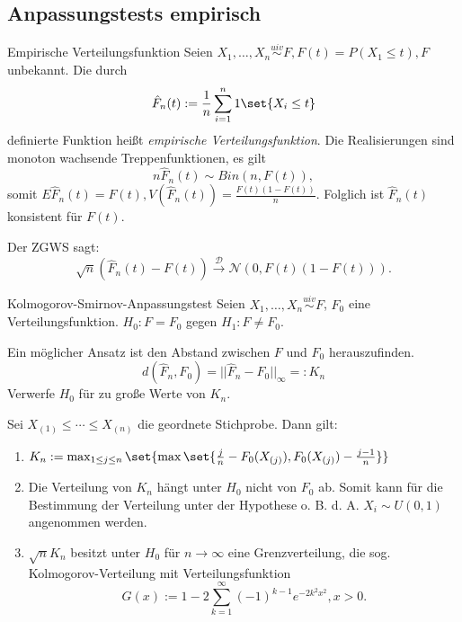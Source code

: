 \subsection{Anpassungstests empirisch}

\begin{karte}{Empirische Verteilungsfunktion}
Seien \(X_1, \ldots, X_n \overset{uiv}{\sim} F, F(t) = P(X_1 \leq t), F\) unbekannt. 
Die durch 
\[ \hat{F}_n(t) := \frac{1}{n}\sum_{i=1}^n 1\set{X_i \leq t} \]
definierte Funktion heißt \textit{empirische Verteilungsfunktion}.
Die Realisierungen sind monoton wachsende Treppenfunktionen, es gilt 
\[ n \hat{F}_n(t) \sim Bin(n, F(t)), \]
somit \(E \hat{F}_n(t) = F(t), V(\hat{F}_n(t)) = \frac{F(t) (1-F(t))}{n}\).
Folglich ist \(\hat{F}_n(t)\) konsistent für \(F(t)\).

Der ZGWS sagt: 
\[ \sqrt{n} (\hat{F}_n(t) - F(t)) \overset{\mathcal{D}}{\longrightarrow} \mathcal{N}(0,F(t)(1-F(t))). \]
\end{karte}

\begin{karte}{Kolmogorov-Smirnov-Anpassungstest}
Seien \(X_1, \ldots, X_n \overset{uiv}{\sim} F\), \(F_0\) eine Verteilungsfunktion.
\(H_0: F = F_0\) gegen \(H_1: F \neq F_0\).

Ein möglicher Ansatz ist den Abstand zwischen \(F\) und \(F_0\) herauszufinden. 
\[ d(\hat{F}_n, F_0) = ||\hat{F}_n - F_0||_\infty =: K_n \]
Verwerfe \(H_0\) für zu große Werte von \(K_n\).

Sei \(X_{(1)} \leq \cdots \leq X_{(n)}\) die geordnete Stichprobe. Dann gilt: 
\begin{enumerate}
    \item \(K_n := \max_{1\leq j\leq n} \set{ \max\set{ \frac{j}{n} - F_0(X_{(j)}), F_0(X_{(j)}) - \frac{j-1}{n} } }\)
    \item Die Verteilung von \(K_n\) hängt unter \(H_0\) nicht von \(F_0\) ab. Somit kann für die Bestimmung 
    der Verteilung unter der Hypothese o. B. d. A. \(X_i \sim U(0,1)\) angenommen werden.
    \item \(\sqrt{n} K_n\) besitzt unter \(H_0\) für \(n\rightarrow\infty\) eine Grenzverteilung, die sog. 
    Kolmogorov-Verteilung mit Verteilungsfunktion 
    \[ G(x) := 1 - 2\sum_{k=1}^\infty (-1)^{k-1} e^{-2k^2 x^2}, x>0. \]
\end{enumerate}
\end{karte}

